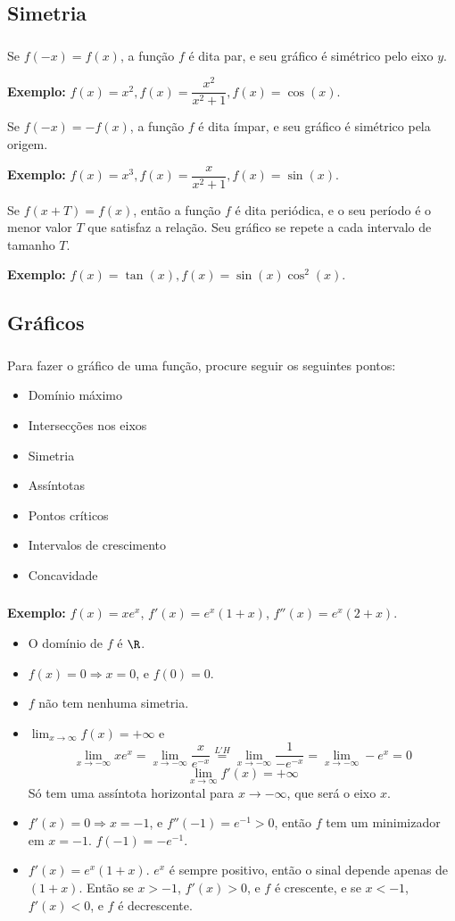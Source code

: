 \documentclass[10 pt]{beamer}
\newcommand{\myframe}[1]{
\begin{frame}
 \frametitle{\insertsection \qquad {\small \insertsubsection}}
#1
\end{frame}}
\newcommand{\spc}{\vspace{0.5 cm}}
\newcommand{\limx}[1]{\lim_{x\rightarrow{#1}}}
\begin{document}
\subsection{Simetria}

\myframe {
  Se $f(-x) = f(x)$, a função $f$ é dita par, e seu gráfico é simétrico
  pelo eixo $y$.
  
  {\bf Exemplo:} $f(x) = x^2, f(x) = \dfrac{x^2}{x^2 + 1}, f(x) = \cos(x)$.
  \spc

  Se $f(-x) = -f(x)$, a função $f$ é dita ímpar, e seu gráfico é simétrico
  pela origem.

  {\bf Exemplo:} $f(x) = x^3, f(x) = \dfrac{x}{x^2 + 1}, f(x) = \sin(x)$.
  \spc

  Se $f(x+T) = f(x)$, então a função $f$ é dita periódica, e o seu
  período é o menor valor $T$ que satisfaz a relação.
  Seu gráfico se repete a cada intervalo de tamanho $T$.

  {\bf Exemplo:} $f(x) = \tan(x), f(x) = \sin(x)\cos^2(x)$.
}

\subsection{Gráficos}

\myframe {
  Para fazer o gráfico de uma função, procure seguir os seguintes pontos:
  \begin{itemize}
    \item Domínio máximo
    \item Intersecções nos eixos
    \item Simetria
    \item Assíntotas
    \item Pontos críticos
    \item Intervalos de crescimento
    \item Concavidade
  \end{itemize}
}

\myframe {
  {\bf Exemplo: } $f(x) = xe^x$, $f'(x) = e^x(1+x)$, $f''(x) = e^x(2+x)$.
  \begin{itemize}
    \item O domínio de $f$ é $\R$.
    \item $f(x) = 0 \Rightarrow x = 0$, e $f(0) = 0$.
    \item $f$ não tem nenhuma simetria.
    \item $\displaystyle \limx{\infty}f(x) = +\infty$ e
      $$ \displaystyle \limx{-\infty}xe^x =
        \limx{-\infty}\frac{x}{e^{-x}} \overset{L'H}{=}
        \limx{-\infty}\frac{1}{-e^{-x}} =
        \limx{-\infty}-e^x = 0 $$
     $$ \limx{\infty} f'(x) = +\infty $$
     Só tem uma assíntota horizontal para $x\rightarrow-\infty$, que
      será o eixo $x$.
    \item $f'(x) = 0 \Rightarrow x = -1$, e $f''(-1) = e^{-1} > 0$, então
      $f$ tem um minimizador em $x=-1$. $f(-1) = -e^{-1}$.
    \item $f'(x) = e^x(1+x)$. $e^x$ é sempre positivo, então o sinal depende
      apenas de $(1+x)$. Então se $x > -1$, $f'(x) > 0$, e $f$ é crescente,
      e se $x < -1$, $f'(x) < 0$, e $f$ é decrescente.
  \end{itemize}
}
\end{document}

